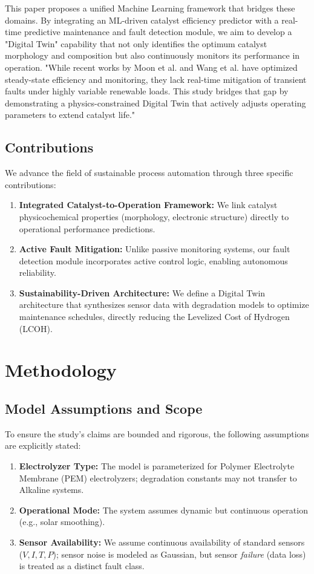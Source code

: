 \documentclass[preprint,12pt]{elsarticle}
\begin{document}
This paper proposes a unified Machine Learning framework that bridges these domains. By integrating an ML-driven catalyst efficiency predictor with a real-time predictive maintenance and fault detection module, we aim to develop a "Digital Twin" capability that not only identifies the optimum catalyst morphology and composition but also continuously monitors its performance in operation. "While recent works by Moon et al. \cite{moon2025} and Wang et al. \cite{wang2024} have optimized steady-state efficiency and monitoring, they lack real-time mitigation of transient faults under highly variable renewable loads. This study bridges that gap by demonstrating a physics-constrained Digital Twin that actively adjusts operating parameters to extend catalyst life."

\subsection{Contributions}
We advance the field of sustainable process automation through three specific contributions:
\begin{enumerate}
    \item \textbf{Integrated Catalyst-to-Operation Framework:} We link catalyst physicochemical properties (morphology, electronic structure) directly to operational performance predictions.
    \item \textbf{Active Fault Mitigation:} Unlike passive monitoring systems, our fault detection module incorporates active control logic, enabling autonomous reliability.
    \item \textbf{Sustainability-Driven Architecture:} We define a Digital Twin architecture that synthesizes sensor data with degradation models to optimize maintenance schedules, directly reducing the Levelized Cost of Hydrogen (LCOH).
\end{enumerate}

\section{Methodology}

\subsection{Model Assumptions and Scope}
To ensure the study's claims are bounded and rigorous, the following assumptions are explicitly stated:
\begin{enumerate}
    \item \textbf{Electrolyzer Type:} The model is parameterized for Polymer Electrolyte Membrane (PEM) electrolyzers; degradation constants may not transfer to Alkaline systems.
    \item \textbf{Operational Mode:} The system assumes dynamic but continuous operation (e.g., solar smoothing).
    \item \textbf{Sensor Availability:} We assume continuous availability of standard sensors ($V, I, T, P$); sensor noise is modeled as Gaussian, but sensor \textit{failure} (data loss) is treated as a distinct fault class.
\end{enumerate}
\end{document}
